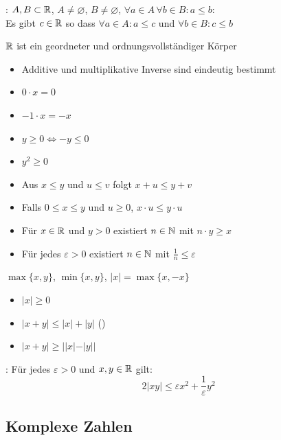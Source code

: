 \Satz {}: $A, B \subset \mathbb{R}$, $A\ne \varnothing$, $B\ne \varnothing$,
$\forall a \in A \, \forall b \in B : a\le b$: \\
Es gibt $c \in \mathbb{R}$ so dass $\forall a \in A : a\le c$ und $\forall b \in B : c\le b$

\Satz $\mathbb{R}$ ist ein geordneter und ordnungsvollständiger Körper

\Kor {}
\vspace{-0.6em}
\begin{itemize}
    \item Additive und multiplikative Inverse sind eindeutig bestimmt
    \item $0 \cdot x = 0$
    \item $-1 \cdot x = -x$
    \item $y\ge 0 \iff -y\le 0$
    \item $y^2\ge 0$
    \item Aus $x\le y$ und $u\le v$ folgt $x + u\le y + v$
    \item Falls $0\le x\le y$ und $u\ge 0$, $x \cdot u\le y \cdot u$
\end{itemize}

\Kor {}
\vspace{-0.6em}
\begin{itemize}
    \item Für $x \in \mathbb{R}$ und $y > 0$ existiert $n \in \mathbb{N}$ mit $n \cdot y\ge x$
    \item Für jedes $\varepsilon > 0$ existiert $n \in \mathbb{N}$ mit $\frac{1}{n}\le \varepsilon$
\end{itemize}

\Def $\max\{x, y\}$, $\min\{x, y\}$,  $|x| = \max\{x, -x\}$

\Satz {}
\vspace{-0.6em}
\begin{itemize}
    \item $|x|\ge 0$
    \item $|x + y|\le |x| + |y|$ ()
    \item $|x + y|\ge ||x| - |y||$
\end{itemize}

\Satz {}: Für jedes $\varepsilon > 0$ und $x, y \in \mathbb{R}$ gilt:
$$2|xy|\le \varepsilon x^2 + \frac{1}{\varepsilon}y^2$$

\subsection{Komplexe Zahlen}

